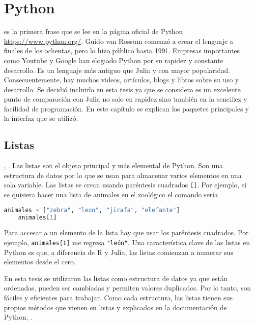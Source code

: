 \chapter{Python}

 es la primera frase que se lee en la página oficial de \textsf{Python} \url{https://www.python.org/}. Guido van Rossum comenzó a crear el lenguaje a finales de los ochentas, pero lo hizo público hasta 1991. Empresas importantes como Youtube y Google han elogiado \textsf{Python} por su rapidez y constante desarrollo. Es un lenguaje más antiguo que \textsf{Julia} y con mayor popularidad. Consecuentemente, hay muchos videos, artículos, blogs y libros sobre su uso y desarrollo. Se decidió incluirlo en esta tesis ya que se considera es un excelente punto de comparación con \textsf{Julia} no solo en rapidez sino también en la sencillez y facilidad de programación. En este capítulo se explican los paquetes principales y la interfaz que se utilizó. 

\section{Listas}
, \cite{matthes2019python}. Las listas son el objeto principal y más elemental de \textsf{Python}. Son una estructura de datos por lo que se usan para almacenar varios elementos en una sola variable. Las listas se crean usando paréntesis cuadrados \texttt{[]}. Por ejemplo, si se quisiera hacer una lista de animales en el zoológico el comando sería 


\begin{lstlisting}[language=Python]
	animales = ["zebra", "leon", "jirafa", "elefante"]
	animales[1]
\end{lstlisting}

Para accesar a un elemento de la lista hay que usar los paréntesis cuadrados. Por ejemplo, \texttt{animales[1]} me regresa \texttt{"león"}. Una característica clave de las listas en \textsf{Python} es que, a diferencia de \textsf{R} y \textsf{Julia}, las listas comienzan a numerar sus elementos desde el cero. 

En esta tesis se utilizaron las listas como estructura de datos ya que están ordenadas, pueden ser cambiadas y permiten valores duplicados. Por lo tanto, son fáciles y eficientes para trabajar. Como cada estructura, las listas tienen sus propios métodos que vienen en listas y explicados en la documentación de \textsf{Python}, \cite{doc_python}. 


